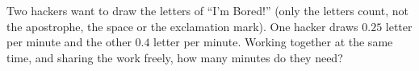 Two hackers want to draw the letters of ``I'm Bored!'' (only the letters count, not the apostrophe, the space or the exclamation mark). One hacker draws $0.25$ letter per minute and the other $0.4$ letter per minute. Working together at the same time, and sharing the work freely, how many minutes do they need?
